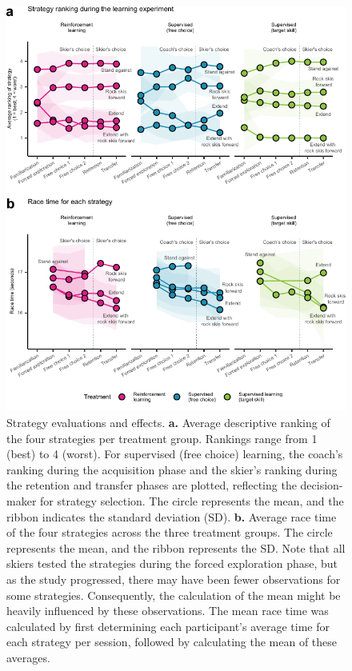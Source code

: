 \documentclass[pdflatex,sn-mathphys-num]{sn-jnl}%
\theoremstyle{thmstyleone}%
\theoremstyle{thmstyletwo}%
\theoremstyle{thmstylethree}%
\begin{document}
\begin{figure}[H]
\centering
\includegraphics[]{figures/figure_ranking_average_3.pdf}
\caption{Strategy evaluations and effects. \textbf{a. }Average descriptive ranking of the four strategies per treatment group. Rankings range from 1 (best) to 4 (worst). For supervised (free choice) learning, the coach's ranking during the acquisition phase and the skier's ranking during the retention and transfer phases are plotted, reflecting the decision- maker for strategy selection. The circle represents the mean, and the ribbon indicates the standard deviation (SD). \textbf{b.} Average race time of the four strategies across the three treatment groups. The circle represents the mean, and the ribbon represents the SD. Note that all skiers tested the strategies during the forced exploration phase, but as the study progressed, there may have been fewer observations for some strategies. Consequently, the calculation of the mean might be heavily influenced by these observations. The mean race time was calculated by first determining each participant's average time for each strategy per session, followed by calculating the mean of these averages.}\label{fig: rank}
\end{figure}
\end{document}

